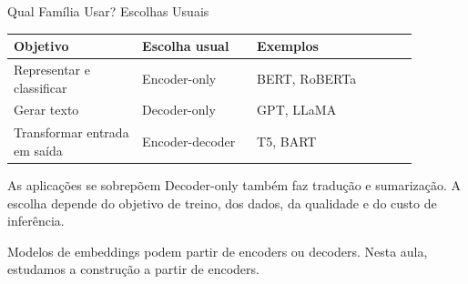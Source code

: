 \documentclass[aspectratio=169, xcolor=dvipsnames]{beamer}
\begin{document}
  \begin{frame}{Qual Família Usar? Escolhas Usuais}
    \begin{tabular}{p{0.28\linewidth}p{0.25\linewidth}p{0.35\linewidth}}
      \toprule
      \textbf{Objetivo} & \textbf{Escolha usual} & \textbf{Exemplos} \\
      \midrule
      Representar e classificar & Encoder-only & BERT, RoBERTa \\
      Gerar texto & Decoder-only & GPT, LLaMA \\
      Transformar entrada em saída & Encoder-decoder & T5, BART \\
      \bottomrule
    \end{tabular}
    \vspace{0.5em}
    \begin{block}{As aplicações se sobrepõem}
      Decoder-only também faz tradução e sumarização. A escolha depende
      do objetivo de treino, dos dados, da qualidade e do custo de inferência.
    \end{block}
    Modelos de embeddings podem partir de encoders ou decoders.
    Nesta aula, estudamos a construção a partir de encoders.
  \end{frame}
\end{document}
